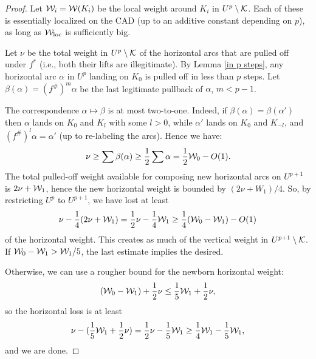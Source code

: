 \begin{proof}
  Let ${\mathcal W}_i={\mathcal W}(K_i)$ be the local weight around $K_i$ in $U^p\setminus {\mathcal K}$.
Each of these is  essentially localized on the CAD (up to an additive constant depending on $p$),
as long as ${\mathcal W}_{\mathrm{loc}}$ is sufficiently big. 

Let $\nu$ be the total weight in $U^p\setminus {\mathcal K}$ of the horizontal arcs that are pulled off under $f^*$
(i.e., both their lifts are illegitimate).
By Lemma \ref{in p steps},  any horizontal arc $\alpha$ in $U^p$  landing on $K_0$ is pulled off in less than $p$ steps.
Let $\beta(\alpha) = (f^\#)^m \alpha$ be the last legitimate pullback of $\alpha$, $m<p-1$.

The correspondence  $\alpha\mapsto \beta$ is at most  two-to-one.
Indeed, if $\beta(\alpha)= \beta(\alpha')$ then $\alpha$ lands on $K_0$ and $K_l$ with some $l>0$,
while $\alpha'$ lands on $K_0$ and $K_{-l}$, and $(f^\#)^l \alpha =\alpha'$ (up to re-labeling the arcs).  
Hence we have:
$$
    \nu \geq \sum \beta(\alpha) \geq  \frac 12 \sum \alpha = \frac 12 {\mathcal W}_0   -  O(1).    
$$
The total pulled-off weight available for composing new horizontal arcs on $U^{p+1}$   is $2 \nu + {\mathcal W}_1$,
hence the new horizontal weight is bounded by  
$ (2\nu + W_1) /  4 $. 
So, by restricting $U^p$ to $U^{p+1}$, we have lost at least
\begin{equation}\label{hor loss}
  \nu -  \frac 14 (2\nu + {\mathcal W}_1)  = \frac 12 \nu - \frac 14 {\mathcal W}_1 \geq \frac 14 ({\mathcal W}_0 - {\mathcal W}_1) - O(1)
\end{equation}
of the horizontal weight. This creates as much of the vertical weight in $U^{p+1}\setminus {\mathcal K}$.  
If ${\mathcal W}_0-{\mathcal W}_1> {\mathcal W}_1/5$, the last estimate implies the desired.

 Otherwise, we can use a rougher bound for the newborn  horizontal weight:
$$
     ({\mathcal W}_0-{\mathcal W}_1) + \frac 12 \nu \leq \frac 15 {\mathcal W}_1 + \frac 12 \nu,
$$  
so the horizontal loss is at least
$$
  \nu-  (\frac 15 {\mathcal W}_1 + \frac 12 \nu) = \frac 12 \nu - \frac 15 {\mathcal W}_1 \geq \frac 14 {\mathcal W}_1 -  \frac 15 {\mathcal W}_1, 
$$
and we are done. 
\end{proof}


